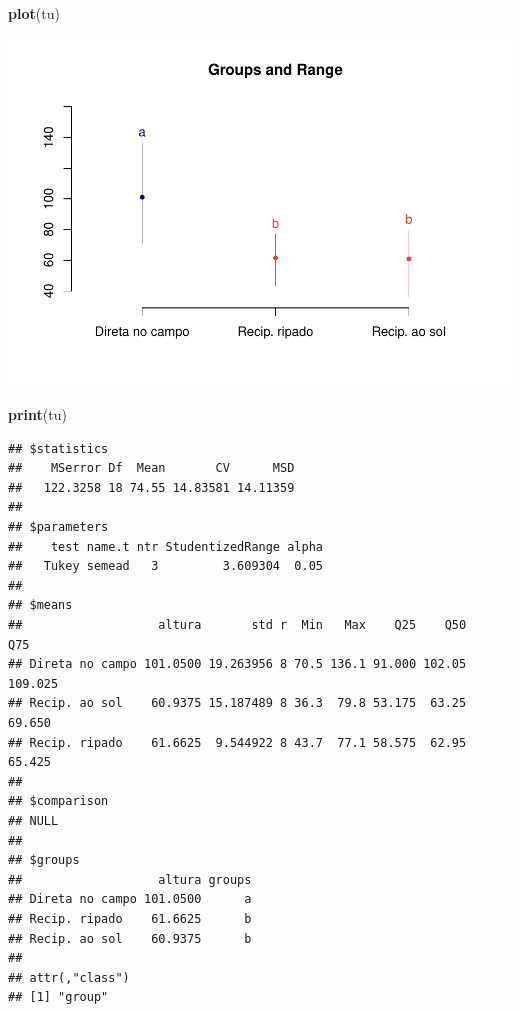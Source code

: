 \documentclass[
]{book}
\newenvironment{Shaded}{\begin{snugshade}}{\end{snugshade}}
\newcommand{\KeywordTok}[1]{\textcolor[rgb]{0.13,0.29,0.53}{\textbf{#1}}}
\newcommand{\NormalTok}[1]{#1}
\begin{document}
\begin{Shaded}
\begin{Highlighting}[]
\KeywordTok{plot}\NormalTok{(tu)}
\end{Highlighting}
\end{Shaded}

\includegraphics{TudodoR_files/figure-latex/unnamed-chunk-318-1.pdf}

\begin{Shaded}
\begin{Highlighting}[]
\KeywordTok{print}\NormalTok{(tu)}
\end{Highlighting}
\end{Shaded}

\begin{verbatim}
## $statistics
##    MSerror Df  Mean       CV      MSD
##   122.3258 18 74.55 14.83581 14.11359
## 
## $parameters
##    test name.t ntr StudentizedRange alpha
##   Tukey semead   3         3.609304  0.05
## 
## $means
##                   altura       std r  Min   Max    Q25    Q50     Q75
## Direta no campo 101.0500 19.263956 8 70.5 136.1 91.000 102.05 109.025
## Recip. ao sol    60.9375 15.187489 8 36.3  79.8 53.175  63.25  69.650
## Recip. ripado    61.6625  9.544922 8 43.7  77.1 58.575  62.95  65.425
## 
## $comparison
## NULL
## 
## $groups
##                   altura groups
## Direta no campo 101.0500      a
## Recip. ripado    61.6625      b
## Recip. ao sol    60.9375      b
## 
## attr(,"class")
## [1] "group"
\end{verbatim}
\end{document}
